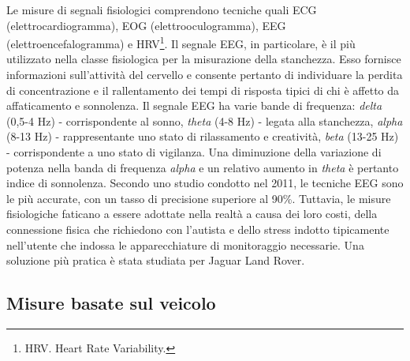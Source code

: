 \documentclass[12pt]{article}
\begin{document}
Le misure di segnali fisiologici comprendono tecniche quali ECG (elettrocardiogramma), EOG (elettrooculogramma), EEG (elettroencefalogramma) e HRV\footnote{HRV. Heart Rate Variability.}.
Il segnale EEG, in particolare, è il più utilizzato nella classe fisiologica per la misurazione della stanchezza. Esso fornisce informazioni sull'attività del cervello e consente pertanto di individuare la perdita di concentrazione e il rallentamento dei tempi di risposta tipici di chi è affetto da affaticamento e sonnolenza. Il segnale EEG ha varie bande di frequenza: \textit{delta} (0,5-4 Hz) - corrispondente al sonno, \textit{theta} (4-8 Hz) - legata alla stanchezza, \textit{alpha} (8-13 Hz) - rappresentante uno stato di rilassamento e creatività, \textit{beta} (13-25 Hz) - corrispondente a uno stato di vigilanza. Una diminuzione della variazione di potenza nella banda di frequenza \textit{alpha} e un relativo aumento in \textit{theta} è pertanto indice di sonnolenza. Secondo uno studio condotto nel 2011\cite{EEG}, le tecniche EEG sono le più accurate, con un tasso di precisione superiore al 90\%. Tuttavia, le misure fisiologiche faticano a essere adottate nella realtà a causa dei loro costi, della connessione fisica che richiedono con l'autista e dello stress indotto tipicamente nell'utente che indossa le apparecchiature di monitoraggio necessarie. Una soluzione più pratica è stata studiata per Jaguar Land Rover\cite{Jaguar}.

\subsection{Misure basate sul veicolo}
\end{document}
